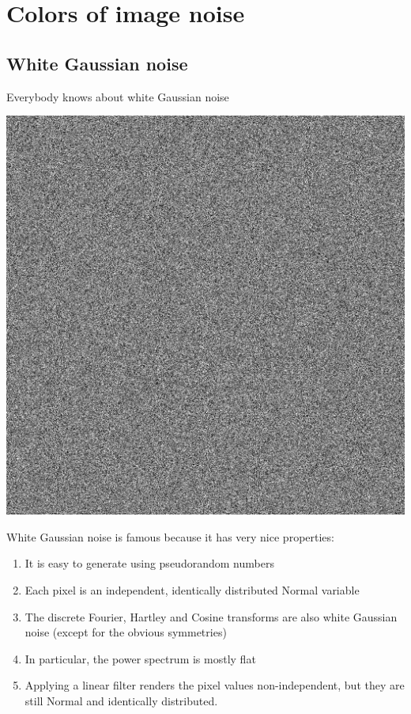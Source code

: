\section{Colors of image noise}


\subsection{White Gaussian noise}

Everybody knows about white Gaussian noise

\includegraphics{white.png}


White Gaussian noise is famous because it has very nice properties:

\begin{enumerate}
	\item It is easy to generate using pseudorandom numbers
	\item Each pixel is an independent, identically distributed Normal
		variable
	\item The discrete Fourier, Hartley and Cosine transforms are also
		white Gaussian noise (except for the obvious symmetries)
	\item In particular, the power spectrum is mostly flat
	\item Applying a linear filter renders the pixel values
		non-independent, but they are still Normal and identically
		distributed.
\end{enumerate}


